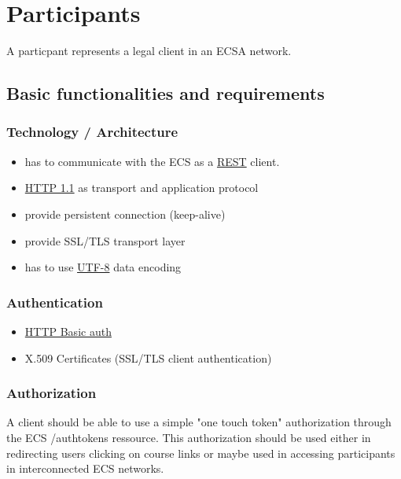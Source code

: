 \chapter{Participants}
A particpant represents a legal client in an ECSA network.

\hypertarget{participant-basic-requirements}{}
\section{Basic functionalities and requirements}
\subsection{Technology / Architecture}
\begin{itemize}
  \item has to communicate with the ECS as a
  \href{http://en.wikipedia.org/wiki/REST}{REST} client.
  \item \href{http://www.w3.org/Protocols/rfc2616/rfc2616.html}{HTTP 1.1} as
  transport and application protocol
  \item provide persistent connection (keep-alive)
  \item provide SSL/TLS transport layer
  \item has to use \href{http://en.wikipedia.org/wiki/UTF-8}{UTF-8} data
    encoding
\end{itemize}

\subsection{Authentication}
\begin{itemize}
  \item \href{http://en.wikipedia.org/wiki/Basic_access_authentication}{HTTP
  Basic auth}
  \item X.509 Certificates (SSL/TLS client authentication)
\end{itemize}

\subsection{Authorization}
  A client should be able to use a simple "one touch token"
  authorization through the ECS /authtokens ressource. This authorization
  should be used either in redirecting users clicking on course links or
  maybe used in accessing participants in interconnected ECS networks. 

